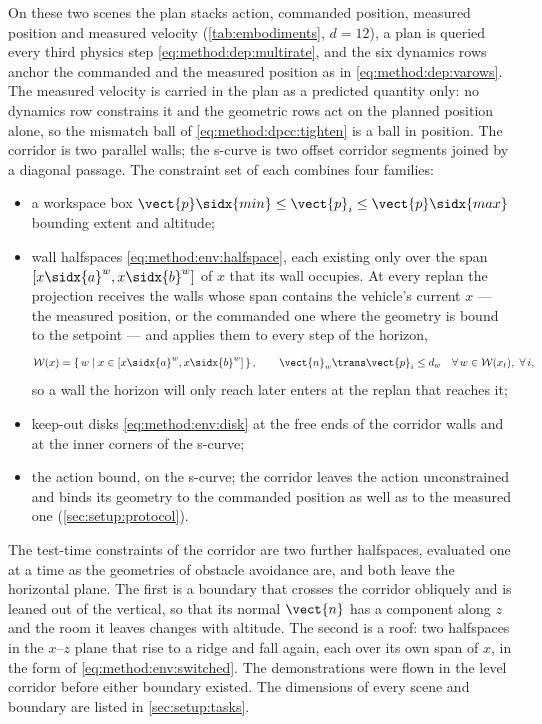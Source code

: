 On these two scenes the plan stacks action, commanded position, measured position and measured velocity
(\autoref{tab:embodiments}, $d = 12$), a plan is queried every third physics step
\eqref{eq:method:dep:multirate}, and the six dynamics rows anchor the commanded and the measured position
as in \eqref{eq:method:dep:varows}. The measured velocity is carried in the plan as a predicted quantity only:
no dynamics row constrains it and the geometric rows act on the planned position alone, so the mismatch ball of
\eqref{eq:method:dpcc:tighten} is a ball in position. The corridor is two parallel walls; the s-curve is two offset corridor
segments joined by a diagonal passage. The constraint set of each combines four families:
\begin{itemize}
  \item a workspace box $\vect{p}\sidx{min}\le\vect{p}_{i}\le\vect{p}\sidx{max}$ bounding extent and
    altitude;
  \item wall halfspaces \eqref{eq:method:env:halfspace}, each existing only over the span
    $[x\sidx{a}^{w},x\sidx{b}^{w}]$ of $x$ that its wall occupies. At every replan the projection receives
    the walls whose span contains the vehicle's current $x$ --- the measured position, or the commanded one
    where the geometry is bound to the setpoint --- and applies them to every step of the horizon,
    \begin{equation}\label{eq:method:env:switched}
      \mathcal{W}(x) = \left\{\,w \;\middle|\; x \in [x\sidx{a}^{w},x\sidx{b}^{w}]\,\right\},
      \qquad
      \vect{n}_{w}\trans\vect{p}_{i} \le d_{w}
      \quad \forall\, w \in \mathcal{W}(x_{t}),\ \forall\, i ,
    \end{equation}
    so a wall the horizon will only reach later enters at the replan that reaches it;
  \item keep-out disks \eqref{eq:method:env:disk} at the free ends of the corridor walls and at the
    inner corners of the s-curve;
  \item the action bound, on the s-curve; the corridor leaves the action unconstrained and binds its
    geometry to the commanded position as well as to the measured one (\autoref{sec:setup:protocol}).
\end{itemize}
The test-time constraints of the corridor are two further halfspaces, evaluated one at a time as the
geometries of obstacle avoidance are, and both leave the horizontal plane. The first is a boundary that
crosses the corridor obliquely and is leaned out of the vertical, so that its normal $\vect{n}$ has a
component along $z$ and the room it leaves changes with altitude. The second is a roof: two halfspaces
in the $x$--$z$ plane that rise to a ridge and fall again, each over its own span of $x$, in the form of
\eqref{eq:method:env:switched}. The demonstrations were flown in the level corridor before either
boundary existed. The dimensions of every scene and boundary are listed in \autoref{sec:setup:tasks}.

